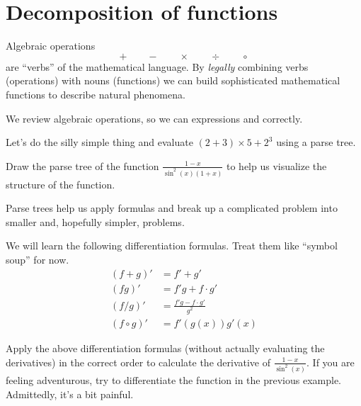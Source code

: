 \documentclass[../main.tex]{subfiles}
\begin{document}
 \section{Decomposition of functions}
  Algebraic operations \[+ \qquad - \qquad \times \qquad \div \qquad \circ\] are ``verbs'' of the mathematical language. By \emph{legally} combining verbs (operations) with nouns (functions) we can build sophisticated mathematical functions to describe natural phenomena. 

  We review algebraic operations, so we can  expressions and  correctly.



  \begin{example}
    Let's do the silly simple thing and evaluate \((2 + 3) \times 5 + 2^{3}\) using a parse tree.
  \end{example}

  \begin{example} 
    Draw the parse tree of the function \(\frac{1 - x}{\sin^{2}(x) (1+x)}\) to help us visualize the structure of the function.
  \end{example}
  \clearpage

  Parse trees help us apply formulas  and break up a complicated problem into smaller and, hopefully simpler, problems.

  We will learn the following differentiation formulas.  Treat them like ``symbol soup'' for now. 
  \begin{align*}
    (f+g)' &= f' + g' \\
    (fg)' &= f'g + f \cdot g' \\
    (f/g)' &= \frac{f'g - f \cdot g'}{g^{2}} \\
    (f \circ g)' &= f'(g(x)) g'(x)
  \end{align*}

  \begin{example}
    Apply the above differentiation formulas (without actually evaluating the derivatives) in the correct order to calculate the derivative of \(\frac{1-x}{\sin^{2}(x)}\).  \newline
    {\scriptsize If you are feeling adventurous, try to differentiate the function in the previous example. Admittedly, it's a bit painful.}
  \end{example}
\end{document}

